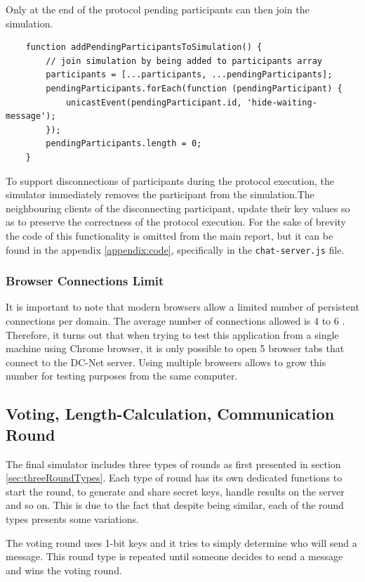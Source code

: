 Only at the end of the protocol pending participants can then join the simulation.

\begin{lstlisting}
    function addPendingParticipantsToSimulation() {
        // join simulation by being added to participants array
        participants = [...participants, ...pendingParticipants];
        pendingParticipants.forEach(function (pendingParticipant) {
            unicastEvent(pendingParticipant.id, 'hide-waiting-message');
        });
        pendingParticipants.length = 0;
    }
\end{lstlisting} 


To support disconnections of participants during the protocol execution, the simulator immediately removes the participant from the simulation.The neighbouring clients of the disconnecting participant, update their key values so as to preserve the correctness of the protocol execution. For the sake of brevity the code of this functionality is omitted from the main report, but it can be found in the appendix \ref{appendix:code}, specifically in the \lstinline{chat-server.js} file.

\subsubsection{Browser Connections Limit}
It is important to note that modern browsers allow a limited number of persistent connections per domain. The average number of connections allowed is 4 to 6 \cite{Souders}. Therefore, it turns out that when trying to test this application from a single machine using Chrome browser, it is only possible to open 5 browser tabs that connect to the DC-Net server. Using multiple browsers allows to grow this number for testing purposes from the same computer.


\subsection{Voting, Length-Calculation, Communication Round}
The final simulator includes three types of rounds as first presented in section \ref{sec:threeRoundTypes}. Each type of round has its own dedicated functions to start the round, to generate and share secret keys, handle results on the server and so on. This is due to the fact that despite being similar, each of the round types presents some variations.

The voting round uses 1-bit keys and it tries to simply determine who will send a message. This round type is repeated until someone decides to send a message and wins the voting round.

